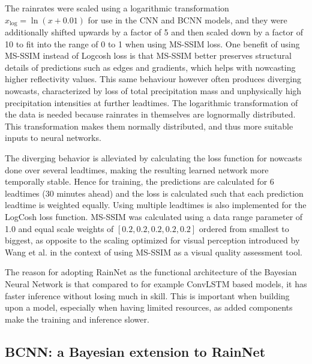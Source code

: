The rainrates were scaled using a logarithmic transformation $x_{\log} = \ln(x + 0.01)$ for use in the CNN and BCNN models, and they were additionally shifted upwards by a factor of 5 and then scaled down by a factor of 10 to fit into the range of 0 to 1 when using MS-SSIM loss. One benefit of using MS-SSIM instead of Logcosh loss is that MS-SSIM better preserves structural details of predictions such as edges and gradients, which helps with nowcasting higher reflectivity values. This same behaviour however often produces diverging nowcasts, characterized by loss of total precipitation mass and unphysically high precipitation intensities at further leadtimes. The logarithmic transformation of the data is needed because rainrates in themselves are lognormally distributed. This transformation makes them normally distributed, and thus more suitable inputs to neural networks.

The diverging behavior is alleviated by calculating the loss function for nowcasts done over several leadtimes, making the resulting learned network more temporally stable. Hence for training, the predictions are calculated for 6 leadtimes (30 minutes ahead) and the loss is calculated such that each prediction leadtime is weighted equally. Using multiple leadtimes is also implemented for the LogCosh loss function. MS-SSIM was calculated using a data range parameter of 1.0 and equal scale weights of $[0.2, 0.2, 0.2, 0.2, 0.2]$ ordered from smallest to biggest, as opposite to the scaling optimized for visual perception introduced by Wang et al. \cite{wang_multiscale_2003} in the context of using MS-SSIM as a visual quality assessment tool. 

The reason for adopting RainNet as the functional architecture of the Bayesian Neural Network is that compared to for example ConvLSTM based models, it has faster inference without losing much in skill. This is important when building upon a model, especially when having limited resources, as added components make the training and inference slower. 


\subsection{BCNN: a Bayesian extension to RainNet}

\label{section:bcnn}


